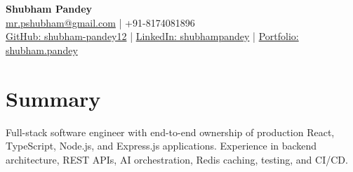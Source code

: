 \documentclass[a4paper,10pt]{article}
\begin{document}
\begin{center}
{\LARGE\textbf{Shubham Pandey}}\\[3pt]
\href{mailto:mr.pshubham@gmail.com}{mr.pshubham@gmail.com} | +91-8174081896\\[2pt]
\href{https://github.com/shubham-pandey12}{GitHub: shubham-pandey12} | \href{https://www.linkedin.com/in/shubham-pandey-a74716199/}{LinkedIn: shubhampandey} | \href{https://shubham-portfolio-mocha.vercel.app/}{Portfolio: shubham.pandey}
\end{center}
\section{Summary}
Full-stack software engineer with end-to-end ownership of production React, TypeScript, Node.js, and Express.js applications. Experience in backend architecture, REST APIs, AI orchestration, Redis caching, testing, and CI/CD.
\end{document}
